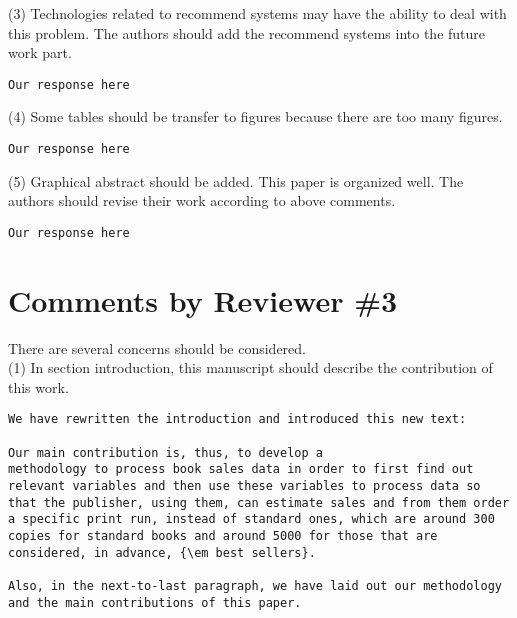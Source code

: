\documentclass[preprint]{elsarticle}
\begin{document}
\noindent (3) Technologies related to recommend systems may have the ability to deal with this problem. The authors should add the recommend systems into the future work part.\\

\begin{verbatim}
Our response here
\end{verbatim}


\noindent (4) Some tables should be transfer to figures because there are too many figures.\\

\begin{verbatim}
Our response here
\end{verbatim}


\noindent (5) Graphical abstract should be added. This paper is organized well. The authors should revise their work according to above comments.\\

\begin{verbatim}
Our response here
\end{verbatim}


\section{Comments by Reviewer \#3}

\noindent There are several concerns should be considered. \\


\noindent (1) In section introduction, this manuscript should describe the contribution of this work.\\

\begin{verbatim}
We have rewritten the introduction and introduced this new text:

Our main contribution is, thus, to develop a
methodology to process book sales data in order to first find out
relevant variables and then use these variables to process data so
that the publisher, using them, can estimate sales and from them order
a specific print run, instead of standard ones, which are around 300
copies for standard books and around 5000 for those that are
considered, in advance, {\em best sellers}.

Also, in the next-to-last paragraph, we have laid out our methodology 
and the main contributions of this paper.

\end{verbatim}
\end{document}
